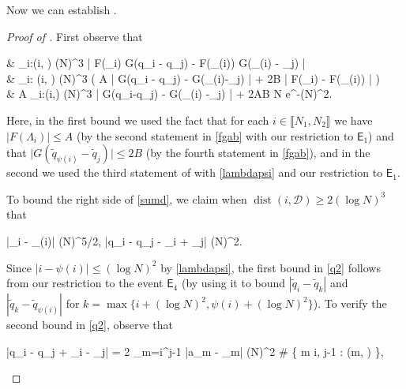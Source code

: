 \documentclass{amsart}
\numberwithin{equation}{section}
\DeclareMathOperator{\dist}{dist}
\theoremstyle{remark}
\theoremstyle{definition}
\begin{document}
	Now we can establish .
	
	\begin{proof}[Proof of ]
		
		First observe that 
		\begin{flalign}
			\label{sumd} 
			\begin{aligned}
				& \displaystyle\sum_{i:\dist (i, )  (\log N)^3} \big| F(\Lambda_i) \cdot G(q_i - q_j) - F(\tilde{\Lambda}_{\psi(i)}) \cdot G(\tilde{q}_{\psi(i)} - _j) \big| \\
				& \qquad \qquad \le \displaystyle\sum_{i: \dist(i, )  (\log N)^3} \big( A \cdot | G(q_i - q_j) - G(\tilde{q}_{\psi(i)}-_j) | + 2B \cdot | F(\Lambda_i) - F(\tilde{\Lambda}_{\psi(i)}) | \big) \\
				& \qquad \qquad \le A \displaystyle\sum_{i:\dist(i,) (\log N)^3} | G(q_i-q_j) - G(\tilde{q}_{\psi(i)} -_j) | + 2AB N e^{-(\log N)^2}.
			\end{aligned} 
		\end{flalign}
		
		\noindent Here, in the first bound we used the fact that for each $i \in \llbracket N_1, N_2 \rrbracket$ we have $| F(\Lambda_i) | \le A$ (by the second statement in \eqref{fgab} with our restriction to $\mathsf{E}_1$) and that $\big| G(\tilde{q}_{\psi(i)} - \tilde{q}_j) \big| \le 2B$ (by the fourth statement in \eqref{fgab}), and in the second we used the third statement of  with \eqref{lambdapsi} and our restriction to $\mathsf{E}_1$. 
		
		To bound the right side of \eqref{sumd}, we claim when $\dist (i, \mathcal{D}) \ge 2(\log N)^3$ that 
		\begin{flalign}
			\label{q2}
			|\tilde{q}_i - _{\psi(i)}| \le (\log N)^{5/2}, \qquad {} \qquad |q_i - q_j - \tilde{q}_i + _j|  (\log N)^2.
		\end{flalign}
		
		\noindent Since $| i - \psi(i) | \le (\log N)^2$ by \eqref{lambdapsi}, the first bound in \eqref{q2} follows from our restriction to the event $\mathsf{E}_4$ (by using it to bound $|\tilde{q}_i - \tilde{q}_k|$ and $|\tilde{q}_k - \tilde{q}_{\psi(i)}|$ for $k = \max \{ i + (\log N)^2, \psi (i) + (\log N)^2 \}$). To verify the second bound in \eqref{q2}, observe that 
		\begin{flalign}
			\label{qij2} 
			|q_i - q_j + \tilde{q}_i - _j| = 2 \displaystyle\sum_{m=i}^{j-1} |\log a_m - \log {}_m|  (\log N)^2 \cdot \# \{ m \in \llbracket i, j-1 \rrbracket: \dist (m, ) \le 1 \},
		\end{flalign}
		

\end{proof}
\end{document}
